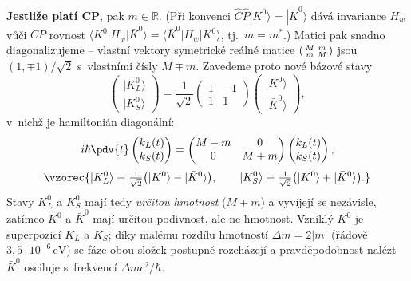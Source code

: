 \textbf{Jestliže platí CP}, pak $m\in\mathbb R$. (Při konvenci $\hat C\hat P|K^0\rangle = |\bar K^0\rangle$ dává invariance $H_w$ vůči $CP$ rovnost $\langle K^0|H_w|\bar K^0\rangle = \langle \bar K^0|H_w|K^0\rangle$, tj.\ $m=m^*$.) Matici pak snadno diagonalizujeme -- vlastní vektory symetrické reálné matice $\begin{psmallmatrix}M&m\\m&M\end{psmallmatrix}$ jsou $(1,\mp1)/\sqrt2$ s~vlastními čísly $M\mp m$. Zavedeme proto nové bázové stavy
\begin{equation}
  \begin{pmatrix} |K^0_L\rangle\\ |K^0_S\rangle\end{pmatrix}
  = \frac{1}{\sqrt2}\begin{pmatrix} 1 & -1\\ 1 & 1\end{pmatrix}
  \begin{pmatrix} |K^0\rangle\\ |\bar K^0\rangle\end{pmatrix},
\end{equation}
v~nichž je hamiltonián diagonální:
\begin{equation}
  i\hbar\pdv{t}\begin{pmatrix} k_L(t)\\ k_S(t)\end{pmatrix}
  = \begin{pmatrix} M-m & 0\\ 0 & M+m\end{pmatrix}
  \begin{pmatrix} k_L(t)\\ k_S(t)\end{pmatrix},
\end{equation}
\begin{equation}
  \vzorec{|K^0_L\rangle \equiv \tfrac{1}{\sqrt2}\big(|K^0\rangle - |\bar K^0\rangle\big),\qquad
  |K^0_S\rangle \equiv \tfrac{1}{\sqrt2}\big(|K^0\rangle + |\bar K^0\rangle\big).}
\end{equation}
Stavy $K^0_L$ a $K^0_S$ mají tedy \emph{určitou hmotnost} ($M\mp m$) a vyvíjejí se nezávisle, zatímco $K^0$ a $\bar K^0$ mají určitou podivnost, ale ne hmotnost. Vzniklý $K^0$ je superpozicí $K_L$ a $K_S$; díky malému rozdílu hmotností $\Delta m = 2|m|$ (řádově $3{,}5\cdot10^{-6}\,\mathrm{eV}$) se fáze obou složek postupně rozcházejí a pravděpodobnost nalézt $\bar K^0$ osciluje s~frekvencí $\Delta m c^2/\hbar$.

